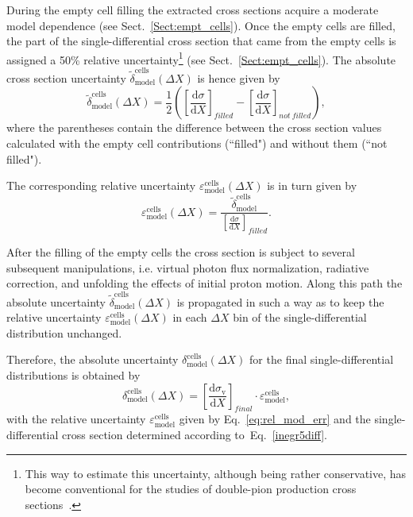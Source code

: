 During the empty cell filling the extracted cross sections acquire a moderate model dependence (see Sect.~\ref{Sect:empt_cells}). Once the empty cells are filled, the part of the single-differential cross section that came from the empty cells is assigned a 50\% relative uncertainty\footnote[4]{This way to estimate this uncertainty, although being rather conservative, has become conventional for the studies of double-pion production cross sections~\cite{Isupov:2017lnd,Fed_an_note:2017,Golovach}. } (see Sect.~\ref{Sect:empt_cells}). The absolute cross section uncertainty $\widetilde{\delta}^{\text{cells}}_{\text{model}}(\Delta X)$ is hence given by
\begin{equation}
\widetilde{\delta}^{\text{cells}}_{\text{model}} (\Delta X) = \frac{1}{2}\left ( \left [ \frac{\textrm{d}\sigma}{\textrm{d}X} \right ]_{filled} - \left [\frac{\textrm{d}\sigma}{\textrm{d}X} \right ]_{not~filled} \right ),
\label{eq:error_mod_abs_tmp}
\end{equation}
where the parentheses contain the difference between the cross section values calculated with the empty cell contributions (``filled") and without them (``not filled").


The corresponding relative uncertainty $\varepsilon^{\text{cells}}_{\text{model}} (\Delta X)$ is in turn given by 
\begin{equation}
\varepsilon^{\text{cells}}_{\text{model}} (\Delta X) = \dfrac{\widetilde{\delta}^{\text{cells}}_{\text{model}}}{\left [ \frac{\textrm{d}\sigma}{\textrm{d}X} \right ]_{filled}}.
\label{eq:rel_mod_err}
\end{equation}

After the filling of the empty cells the cross section is subject to several subsequent manipulations, i.e. virtual photon flux normalization, radiative correction, and unfolding the effects of initial proton motion. Along this path the absolute uncertainty $\widetilde{\delta}^{\text{cells}}_{\text{model}} (\Delta X)$ is propagated in such a way as to keep the relative uncertainty $\varepsilon^{\text{cells}}_{\text{model}}(\Delta X)$ in each $\Delta X$ bin of the single-differential distribution unchanged.

Therefore, the absolute uncertainty $\delta^{\text{cells}}_{\text{model}} (\Delta X)$ for the final single-differential distributions is obtained by
\begin{equation}
\delta^{\text{cells}}_{\text{model}} (\Delta X) = \left [ \frac{\textrm{d}\sigma_{\text{v}}}{\textrm{d}X} \right ]_{final}\!\! \cdot \varepsilon^{\text{cells}}_{\text{model}},
\label{eq:error_mod_abs}
\end{equation}
with the relative uncertainty $\varepsilon^{\text{cells}}_{\text{model}}$ given by Eq.~\eqref{eq:rel_mod_err} and the single-differential cross section determined according to~Eq.~\eqref{inegr5diff}.



